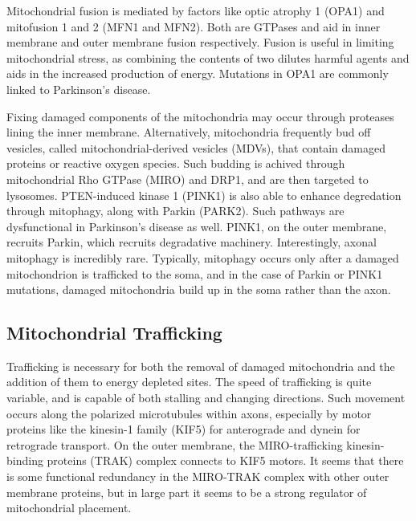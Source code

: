 Mitochondrial fusion is mediated by factors like optic atrophy 1 (OPA1) and mitofusion 1 and 2 (MFN1 and MFN2). Both are GTPases and aid in inner membrane and outer membrane fusion respectively. Fusion is useful in limiting mitochondrial stress, as combining the contents of two dilutes harmful agents and aids in the increased production of energy. Mutations in OPA1 are commonly linked to Parkinson's disease.\newline

Fixing damaged components of the mitochondria may occur through proteases lining the inner membrane. Alternatively, mitochondria frequently bud off vesicles, called mitochondrial-derived vesicles (MDVs), that contain damaged proteins or reactive oxygen species. Such budding is achived through mitochondrial Rho GTPase (MIRO) and DRP1, and are then targeted to lysosomes. PTEN-induced kinase 1 (PINK1) is also able to enhance degredation through mitophagy, along with Parkin (PARK2). Such pathways are dysfunctional in Parkinson's disease as well. PINK1, on the outer membrane, recruits Parkin, which recruits degradative machinery. Interestingly, axonal mitophagy is incredibly rare. Typically, mitophagy occurs only after a damaged mitochondrion is trafficked to the soma, and in the case of Parkin or PINK1 mutations, damaged mitochondria build up in the soma rather than the axon. 

\subsection{Mitochondrial Trafficking}

Trafficking is necessary for both the removal of damaged mitochondria and the addition of them to energy depleted sites. The speed of trafficking is quite variable, and is capable of both stalling and changing directions. Such movement occurs along the polarized microtubules within axons, especially by motor proteins like the kinesin-1 family (KIF5) for anterograde and dynein for retrograde transport. On the outer membrane, the MIRO-trafficking kinesin-binding proteins (TRAK) complex connects to KIF5 motors. It seems that there is some functional redundancy in the MIRO-TRAK complex with other outer membrane proteins, but in large part it seems to be a strong regulator of mitochondrial placement.\newline

